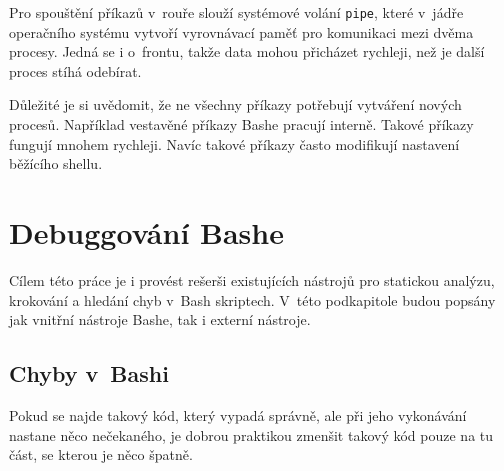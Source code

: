 \documentclass[thesis=M,czech]{FITthesis}[2012/06/26]
\begin{document}
Pro spouštění příkazů v~rouře slouží systémové volání \texttt{pipe}, které v~jádře operačního systému vytvoří vyrovnávací paměť pro komunikaci mezi dvěma procesy. Jedná se i o~frontu, takže data mohou přicházet rychleji, než je další proces stíhá odebírat.

Důležité je si uvědomit, že ne všechny příkazy potřebují vytváření nových procesů. Například vestavěné příkazy Bashe pracují interně. Takové příkazy fungují mnohem rychleji. Navíc takové příkazy často modifikují nastavení běžícího shellu.













%
%
\section{Debuggování Bashe} %

Cílem této práce je i provést rešerši existujících nástrojů pro statickou analýzu, krokování a hledání chyb v~Bash skriptech. V~této podkapitole budou popsány jak vnitřní nástroje Bashe, tak i externí nástroje.


%
\subsection{Chyby v~Bashi}

Pokud se najde takový kód, který vypadá správně, ale při jeho vykonávání nastane něco nečekaného, je dobrou praktikou zmenšit takový  kód pouze na tu část, se kterou je něco špatně.
\end{document}
